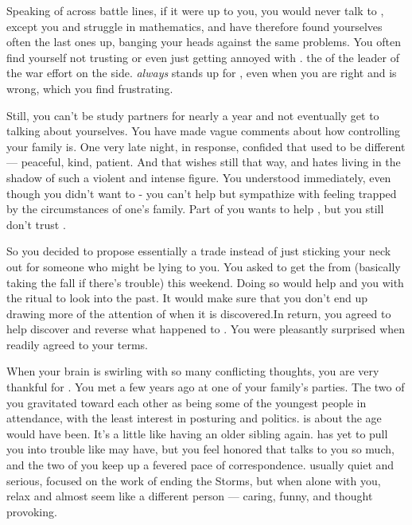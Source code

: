 \documentclass[char]{GL2020}
\begin{document}
Speaking of across battle lines, if it were up to you, you would never talk to \cWarlordDaughter{\full}, except you and \cWarlordDaughter{} struggle in mathematics, and have therefore found yourselves often the last ones up, banging your heads against the same problems. You often find yourself not trusting or even just getting annoyed with \cWarlordDaughter{}. \cWarlordDaughter{\Theyare} the \cWarlordDaughter{\offspring} of the leader of the war effort on the \pShip{} side. \cPresident{} \emph{always} stands up for \cWarlordDaughter{\them}, even when you are right and \cWarlordDaughter{} is wrong, which you find frustrating. 

Still, you can’t be study partners for nearly a year and not eventually get to talking about yourselves.  You have made vague comments about how controlling your family is.  One very late night, in response,  \cWarlordDaughter{} confided that  \cWarlordDaughter{\their} \cLoud{\parent} used to be different — peaceful, kind, patient. And that \cWarlordDaughter{} wishes \cLoud{\theywere} still that way, and hates living in the shadow of such a violent and intense figure. You understood immediately, even though you didn’t want to - you can’t help but sympathize with feeling trapped by the circumstances of one’s family. Part of you wants to help \cWarlordDaughter{} , but you still don’t trust \cWarlordDaughter{\them}. 

So you decided to propose essentially a trade instead of just sticking your neck out for someone who might be lying to you. You asked \cWarlordDaughter{} to get the \iMirror{} from \cDiplomat{} (basically taking the fall if there’s trouble) this weekend. Doing so would help \cPresident{} and you with the ritual to look into the past. It would make sure that you don’t end up drawing more of the attention of \cDiplomat{} when it is discovered.In return, you agreed to help \cWarlordDaughter{} discover and reverse what happened to \cWarlordDaughter{\their}  \cLoud{\parent} \cLoud{}. You were pleasantly surprised when \cWarlordDaughter{\they} readily agreed to your terms. 

When your brain is swirling with so many conflicting thoughts, you are very thankful for \cAssistantScientist{\full}. You met \cAssistantScientist{\them} a few years ago at one of your family’s parties. The two of you gravitated toward each other as being some of the youngest people in attendance, with the least interest in posturing and politics. \cAssistantScientist{} is about the age \cHeirSibling{} would have been. It's a little like having an older sibling again. \cAssistantScientist{} has yet to pull you into trouble like \cHeirSibling{} may have, but you feel honored that \cAssistantScientist{} talks to you so much, and the two of you keep up a fevered pace of correspondence. \cAssistantScientist{\Theyare} usually quiet and serious, focused on the work of ending the Storms, but when \cAssistantScientist{\theyare} alone with you, \cAssistantScientist{\they} relax\cAssistantScientist{\verbes} and almost seem\cAssistantScientist{\verbs} like a different person — caring, funny, and thought provoking. 
\end{document}
